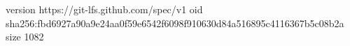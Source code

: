 version https://git-lfs.github.com/spec/v1
oid sha256:fbd6927a90a9e24aa0f59e6542f6098f910630d84a516895c4116367b5c08b2a
size 1082
